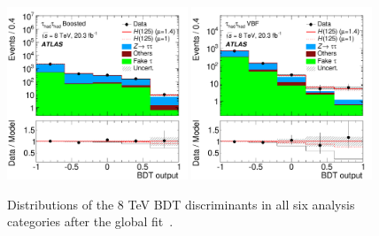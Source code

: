 \begin{figure}[tp]
  \includegraphics[width=0.48\textwidth]{figures/HIGG-2013-32/fig_08f}
  \includegraphics[width=0.48\textwidth]{figures/HIGG-2013-32/fig_08e}
  \caption{Distributions of the 8 TeV BDT discriminants in all six analysis categories after the global fit~\cite{HIGG-2013-32}.}
  \label{fig:results-bdts}
\end{figure}

\clearpage


